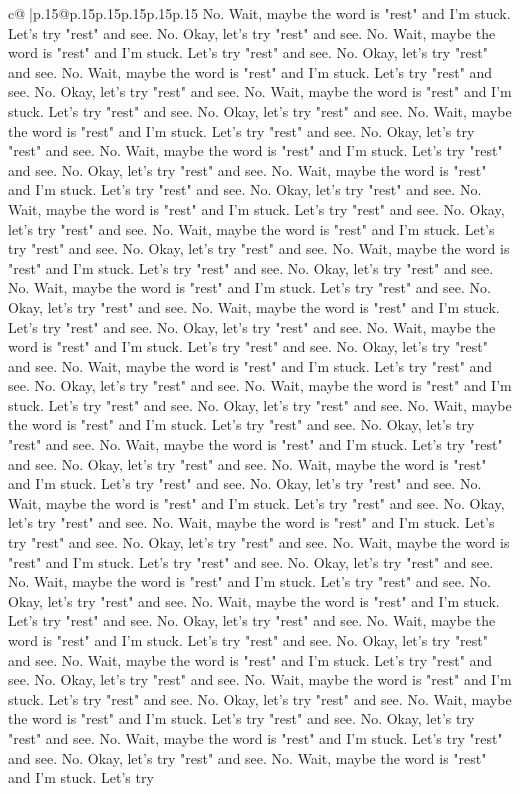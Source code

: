 \documentclass{article}
\begin{document}
{\begin{supertabular}{c@{$\;$}|p{.15\linewidth}@{}p{.15\linewidth}p{.15\linewidth}p{.15\linewidth}p{.15\linewidth}p{.15\linewidth}}
{{{No. Wait, maybe the word is "rest" and I'm stuck. Let's try "rest" and see. No. Okay, let's try "rest" and see. No. Wait, maybe the word is "rest" and I'm stuck. Let's try "rest" and see. No. Okay, let's try "rest" and see. No. Wait, maybe the word is "rest" and I'm stuck. Let's try "rest" and see. No. Okay, let's try "rest" and see. No. Wait, maybe the word is "rest" and I'm stuck. Let's try "rest" and see. No. Okay, let's try "rest" and see. No. Wait, maybe the word is "rest" and I'm stuck. Let's try "rest" and see. No. Okay, let's try "rest" and see. No. Wait, maybe the word is "rest" and I'm stuck. Let's try "rest" and see. No. Okay, let's try "rest" and see. No. Wait, maybe the word is "rest" and I'm stuck. Let's try "rest" and see. No. Okay, let's try "rest" and see. No. Wait, maybe the word is "rest" and I'm stuck. Let's try "rest" and see. No. Okay, let's try "rest" and see. No. Wait, maybe the word is "rest" and I'm stuck. Let's try "rest" and see. No. Okay, let's try "rest" and see. No. Wait, maybe the word is "rest" and I'm stuck. Let's try "rest" and see. No. Okay, let's try "rest" and see. No. Wait, maybe the word is "rest" and I'm stuck. Let's try "rest" and see. No. Okay, let's try "rest" and see. No. Wait, maybe the word is "rest" and I'm stuck. Let's try "rest" and see. No. Okay, let's try "rest" and see. No. Wait, maybe the word is "rest" and I'm stuck. Let's try "rest" and see. No. Okay, let's try "rest" and see. No. Wait, maybe the word is "rest" and I'm stuck. Let's try "rest" and see. No. Okay, let's try "rest" and see. No. Wait, maybe the word is "rest" and I'm stuck. Let's try "rest" and see. No. Okay, let's try "rest" and see. No. Wait, maybe the word is "rest" and I'm stuck. Let's try "rest" and see. No. Okay, let's try "rest" and see. No. Wait, maybe the word is "rest" and I'm stuck. Let's try "rest" and see. No. Okay, let's try "rest" and see. No. Wait, maybe the word is "rest" and I'm stuck. Let's try "rest" and see. No. Okay, let's try "rest" and see. No. Wait, maybe the word is "rest" and I'm stuck. Let's try "rest" and see. No. Okay, let's try "rest" and see. No. Wait, maybe the word is "rest" and I'm stuck. Let's try "rest" and see. No. Okay, let's try "rest" and see. No. Wait, maybe the word is "rest" and I'm stuck. Let's try "rest" and see. No. Okay, let's try "rest" and see. No. Wait, maybe the word is "rest" and I'm stuck. Let's try "rest" and see. No. Okay, let's try "rest" and see. No. Wait, maybe the word is "rest" and I'm stuck. Let's try "rest" and see. No. Okay, let's try "rest" and see. No. Wait, maybe the word is "rest" and I'm stuck. Let's try "rest" and see. No. Okay, let's try "rest" and see. No. Wait, maybe the word is "rest" and I'm stuck. Let's try "rest" and see. No. Okay, let's try "rest" and see. No. Wait, maybe the word is "rest" and I'm stuck. Let's try "rest" and see. No. Okay, let's try "rest" and see. No. Wait, maybe the word is "rest" and I'm stuck. Let's try "rest" and see. No. Okay, let's try "rest" and see. No. Wait, maybe the word is "rest" and I'm stuck. Let's try "rest" and see. No. Okay, let's try "rest" and see. No. Wait, maybe the word is "rest" and I'm stuck. Let's try }}}
\end{supertabular}}
\end{document}
